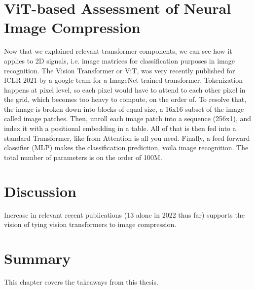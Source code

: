 \documentclass[pdftex,11pt,titlepage,twoside,openright]{report}
\begin{document}
\ThinHRule

\newpage


\chapter{ViT-based Assessment of Neural Image Compression}

Now that we explained relevant transformer components, we can see how it applies to 
2D signals, i.e. image matrices for classification purposes in image recognition.
The Vision Transformer or ViT, was very recently published for ICLR 2021 by a google 
team for a ImageNet trained transformer.
Tokenization happens at pixel level, so each pixel would have to attend to each other 
pixel in the grid, which becomes too heavy to compute, on the order of. 
To resolve that, the image is broken down into blocks of equal size, a 16x16 subset 
of the image called image patches. Then, unroll each image patch into a sequence (256x1), 
and index it with a positional embedding in a table. All of that is then fed into a 
standard Transformer, like from Attention is all you need. Finally, a feed forward 
classifier (MLP) makes the classification prediction, voila image recognition.
The total number of parameters is on the order of 100M.

\ThinHRule

\newpage


\chapter{Discussion}

Increase in relevant recent publications (13 alone in 2022 thus far) supports the vision of tying 
vision transformers to image compression.

\ThinHRule

\newpage


\chapter{Summary}

This chapter covers the takeaways from this thesis.

\ThinHRule

\newpage

\end{document}
